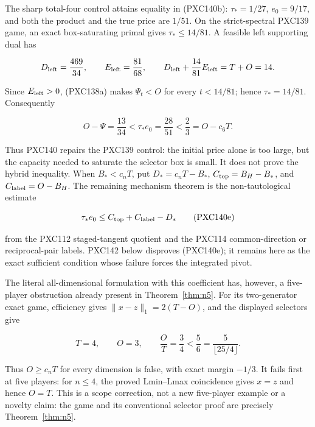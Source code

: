 \documentclass[11pt]{article}
\begin{document}
The sharp total-four control attains equality in (PXC140b):
\(\tau_*=1/27\), \(e_0=9/17\), and both the product and the true price are
\(1/51\).  On the strict-spectral PXC139 game, an exact box-saturating
primal gives \(\tau_*\le14/81\).  A feasible left supporting dual has

\[
 D_{\rm left}=\frac{469}{34},\qquad
 E_{\rm left}=\frac{81}{68},\qquad
 D_{\rm left}+\frac{14}{81}E_{\rm left}=T+O=14.
\]

Since \(E_{\rm left}>0\), (PXC138a) makes \(\Psi_t<O\) for every
\(t<14/81\); hence \(\tau_*=14/81\).  Consequently

\begin{equation}
 O-\Psi=\frac{13}{34}
 <\tau_*e_0=\frac{28}{51}
 <\frac23=O-c_6T.                                      \tag{PXC140d}
\end{equation}

Thus PXC140 repairs the PXC139 control: the initial price alone is too large,
but the capacity needed to saturate the selector box is small.  It does not
prove the hybrid inequality.  When \(B_*<c_nT\), put
\(D_*=c_nT-B_*\), \(C_{\rm top}=B_H-B_*\), and
\(C_{\rm label}=O-B_H\).  The remaining mechanism theorem is the
non-tautological estimate

\begin{equation}
 \tau_*e_0\le
 C_{\rm top}+C_{\rm label}-D_*                         \tag{PXC140e}
\end{equation}

from the PXC112 staged-tangent quotient and the PXC114 common-direction or
reciprocal-pair labels.  PXC142 below disproves (PXC140e); it remains here as
the exact sufficient condition whose failure forces the integrated pivot.

The literal all-dimensional formulation with this coefficient has, however,
a five-player obstruction already present in Theorem~\ref{thm:n5}.  For its
two-generator exact game, efficiency gives
\(\|x-z\|_1=2(T-O)\), and the displayed selectors give

\begin{equation}
 T=4,\qquad O=3,\qquad \frac OT=\frac34
 <\frac56=\frac{5}{\lfloor25/4\rfloor}.                \tag{PXC141a}
\end{equation}

Thus \(O\ge c_nT\) for every dimension is false, with exact margin
\(-1/3\).  It fails first at five players: for \(n\le4\), the proved
Lmin--Lmax coincidence gives \(x=z\) and hence \(O=T\).  This is a scope
correction, not a new five-player example or a novelty claim: the game and
its conventional selector proof are precisely Theorem~\ref{thm:n5}.
\end{document}
